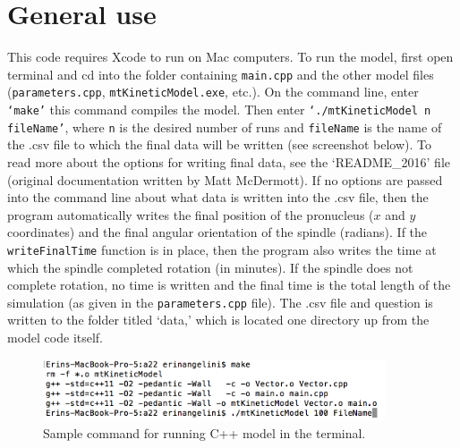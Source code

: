 \documentclass{article}
\begin{document}
\section{General use}
This code requires Xcode to run on Mac computers. To run the model, first open terminal and cd into the folder containing \texttt{main.cpp} and the other model files (\texttt{parameters.cpp}, \texttt{mtKineticModel.exe}, etc.). On the command line, enter \texttt{`make'} \textendash this command compiles the model. Then enter \texttt{`./mtKineticModel n fileName'}, where \texttt{n} is the desired number of runs and \texttt{fileName} is the name of the .csv file to which the final data will be written (see screenshot below). To read more about the options for writing final data, see the `README\_2016' file (original documentation written by Matt McDermott). If no options are passed into the command line about what data is written into the .csv file, then the program automatically writes the final position of the pronucleus ($x$ and $y$ coordinates) and the final angular orientation of the spindle (radians). If the \texttt{writeFinalTime} function is in place, then the program also writes the time at which the spindle completed rotation (in minutes). If the spindle does not complete rotation, no time is written and the final time is the total length of the simulation (as given in the \texttt{parameters.cpp} file). The .csv file and question is written to the folder titled `data,' which is located one directory up from the model code itself.

\begin{figure}[H]
\centering
\includegraphics[width=0.9\textwidth]{figures/sampleRun.png}
\caption{Sample command for running C++ model in the terminal.}
\label{sample}
\end{figure}
\end{document}
